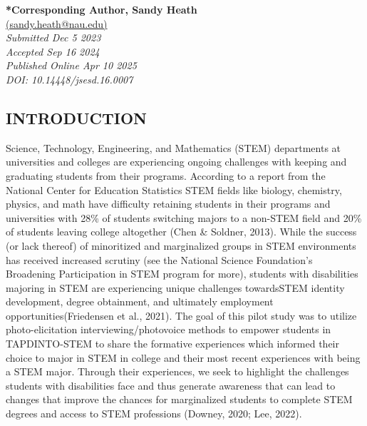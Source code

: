 \documentclass{sig-alternate} %
\begin{document}
\textbf{*Corresponding Author, Sandy Heath}\\ %
\href{mailto:s.sandy.heath@nau.edu}{(sandy.heath@nau.edu)} \\ %
\textit{Submitted Dec 5 2023} \\ %
\textit{Accepted Sep 16 2024} \\ %
\textit{Published Online Apr 10 2025} \\ %
\textit{DOI: 10.14448/jsesd.16.0007} \\ %
\pagebreak 
\clearpage %
\begin{large}
\section*{INTRODUCTION}
Science, Technology, Engineering, and Mathematics (STEM) departments at universities and colleges are experiencing ongoing challenges with keeping and graduating students from their programs. According to a report from the National Center for Education Statistics STEM fields like biology, chemistry, physics, and math have difficulty retaining students in their programs and universities with 28\% of students switching majors to a non-STEM field and 20\% of students leaving college altogether (Chen \& Soldner, 2013). While the success (or lack thereof) of minoritized and marginalized groups in STEM environments has received increased scrutiny (see the National Science Foundation’s Broadening Participation in STEM program for more), students with disabilities majoring in STEM are experiencing unique challenges towardsSTEM identity development, degree obtainment, and ultimately employment opportunities(Friedensen et al., 2021). The goal of this pilot study was to utilize photo-elicitation interviewing/photovoice methods to empower students in TAPDINTO-STEM to share the formative experiences which informed their choice to major in STEM in college and their most recent experiences with being a STEM major. Through their experiences, we seek to highlight the challenges students with disabilities face and thus generate awareness that can lead to changes that improve the chances for marginalized students to complete STEM degrees and access to STEM professions (Downey, 2020; Lee, 2022).


\end{large}
\end{document}
